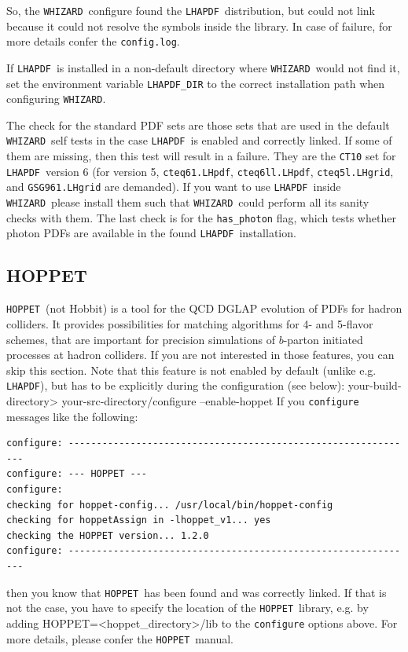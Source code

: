\documentclass[12pt]{book}
\newenvironment{interaction}%
  {\begingroup\small
   \Verbatim}%
  {\endVerbatim
   \endgroup\noindent}
\newcommand{\ttt}[1]{\texttt{#1}}
\newcommand{\whizard}{\ttt{WHIZARD}}
\newcommand{\lhapdf}{\ttt{LHAPDF}}
\newcommand{\hoppet}{\ttt{HOPPET}}
\begin{document}
So, the \whizard\ configure found the \lhapdf\ distribution, but could
not link because it could not resolve the symbols inside the
library. In case of failure, for more details confer the
\ttt{config.log}.

If \lhapdf\ is installed in a non-default directory where
\whizard\ would not find it, set the environment variable
\ttt{LHAPDF\_DIR} to the correct installation path when configuring
\whizard.

The check for the standard PDF sets are those sets that are used in
the default \whizard\ self tests in the case \lhapdf\ is enabled and
correctly linked. If some of them are missing, then this test will
result in a failure. They are the \ttt{CT10} set for \lhapdf\ version
6 (for version 5, \ttt{cteq61.LHpdf}, \ttt{cteq6ll.LHpdf},
\ttt{cteq5l.LHgrid}, and \ttt{GSG961.LHgrid} are demanded). If you
want to use \lhapdf\ inside \whizard\ please install them such that
\whizard\ could perform all its sanity checks with them. The last
check is for the \ttt{has\_photon} flag, which tests whether photon
PDFs are available in the found \lhapdf\ installation.


\subsection{HOPPET}
\label{sec:hoppet}

\hoppet\ (not Hobbit) is a tool for the QCD DGLAP evolution of PDFs
for hadron colliders. It provides possibilities for matching
algorithms for 4- and 5-flavor schemes, that are important for
precision simulations of $b$-parton initiated processes at hadron
colliders. If you are not interested in those features, you can skip
this section. Note that this feature is not enabled by default (unlike
e.g. \lhapdf), but has to be explicitly during the configuration
(see below):
\begin{interaction}
  your-build-directory> your-src-directory/configure --enable-hoppet
\end{interaction}
If you \ttt{configure} messages like the following:
\begin{footnotesize}
\begin{verbatim}
configure: --------------------------------------------------------------
configure: --- HOPPET ---
configure:
checking for hoppet-config... /usr/local/bin/hoppet-config
checking for hoppetAssign in -lhoppet_v1... yes
checking the HOPPET version... 1.2.0
configure: --------------------------------------------------------------
\end{verbatim}
\end{footnotesize}
then you know that \hoppet\ has been found and was correctly
linked. If that is not the case, you have to specify the location of
the \hoppet\ library, e.g. by adding
\begin{interaction}
  HOPPET=<hoppet\_directory>/lib
\end{interaction}
to the \ttt{configure} options above. For more details, please confer
the \hoppet\ manual.
\end{document}
